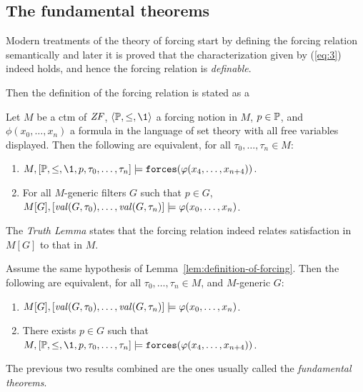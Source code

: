 \subsection{The fundamental theorems}
\label{sec:fundamental-theorems}
Modern treatments of the theory of forcing start
by defining the 
forcing relation semantically and later it is proved  that the
characterization given by (\ref{eq:3}) indeed holds, and hence the
forcing relation is \emph{definable}.

Then the definition of the forcing relation is stated as a
\begin{lemma}\label{lem:definition-of-forcing}
  Let $M$ be a ctm of $\mathit{ZF}$, $\lb\PP,\leq,\1\rb$ a forcing notion
  in $M$, $p\in\mathbb{P}$, and $\phi(x_0,\dots,x_n)$ a formula in the
  language of set 
  theory with all free variables displayed. Then the
  following are equivalent, for all $\tau_0,\dots,\tau_n\in M$:
  \begin{enumerate}
  \item $M,[\PP,\leq,\1,p,\tau_0,\dots,\tau_n] 
  \models\forceisa(\phi(x_4,\dots,x_{n+4}))$.
  \item For all $M$-generic filters $G$ such that $p\in G$,
    $M[G],[\operatorname{\mathit{val}}(G,\tau_0),\dots,\operatorname{\mathit{val}}(G,\tau_n)] \models\varphi(x_0,\dots,x_n)$.
  \end{enumerate}
\end{lemma}

The \emph{Truth Lemma} states that the forcing
relation indeed relates 
satisfaction in $M[G]$ to that in $M$. 
\begin{lemma}\label{lem:truth-lemma}
  Assume the same hypothesis of
  Lemma~\ref{lem:definition-of-forcing}. Then the
  following are equivalent, for all $\tau_0,\dots,\tau_n\in M$, and
  $M$-generic $G$: 
  \begin{enumerate}
  \item $M[G],[\operatorname{\mathit{val}}(G,\tau_0),\dots,\operatorname{\mathit{val}}(G,\tau_n)]
  \models\varphi(x_0,\dots,x_n)$.
  \item  There exists $p\in G$ such that $M,[\PP,\leq,\1,p,\tau_0,\dots,\tau_n] 
  \models\forceisa(\phi(x_4,\dots,x_{n+4}))$.
  \end{enumerate}
\end{lemma}
The previous two results combined are the ones usually called the
\emph{fundamental theorems}. 

